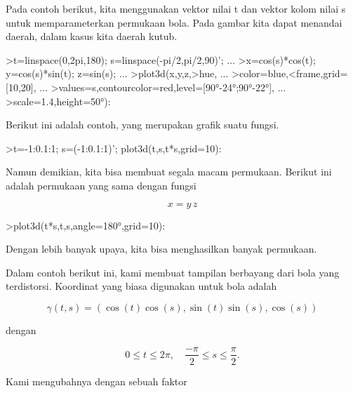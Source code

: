 \documentclass[a4paper,10pt]{article}
\begin{document}
\begin{eulernotebook}
\begin{eulercomment}
\begin{eulercomment}
\begin{eulercomment}
\begin{eulercomment}
\begin{eulercomment}
\begin{eulercomment}
\begin{eulercomment}
\begin{eulercomment}
\begin{eulercomment}
\begin{eulercomment}
\begin{eulercomment}
Pada contoh berikut, kita menggunakan vektor nilai t dan vektor kolom
nilai s untuk memparameterkan permukaan bola. Pada gambar kita dapat
menandai daerah, dalam kasus kita daerah kutub.
\end{eulercomment}
\begin{eulerprompt}
>t=linspace(0,2pi,180); s=linspace(-pi/2,pi/2,90)'; ...
>x=cos(s)*cos(t); y=cos(s)*sin(t); z=sin(s); ...
>plot3d(x,y,z,>hue, ...
>color=blue,<frame,grid=[10,20], ...
>values=s,contourcolor=red,level=[90°-24°;90°-22°], ...
>scale=1.4,height=50°):
\end{eulerprompt}
\begin{eulercomment}
Berikut ini adalah contoh, yang merupakan grafik suatu fungsi.
\end{eulercomment}
\begin{eulerprompt}
>t=-1:0.1:1; s=(-1:0.1:1)'; plot3d(t,s,t*s,grid=10):
\end{eulerprompt}
\begin{eulercomment}
Namun demikian, kita bisa membuat segala macam permukaan. Berikut ini
adalah permukaan yang sama dengan fungsi

\end{eulercomment}
\begin{eulerformula}
\[
x = y \, z
\]
\end{eulerformula}
\begin{eulerprompt}
>plot3d(t*s,t,s,angle=180°,grid=10):
\end{eulerprompt}
\begin{eulercomment}
Dengan lebih banyak upaya, kita bisa menghasilkan banyak permukaan.

Dalam contoh berikut ini, kami membuat tampilan berbayang dari bola
yang terdistorsi. Koordinat yang biasa digunakan untuk bola adalah

\end{eulercomment}
\begin{eulerformula}
\[
\gamma(t,s) = (\cos(t)\cos(s),\sin(t)\sin(s),\cos(s))
\]
\end{eulerformula}
\begin{eulercomment}
dengan

\end{eulercomment}
\begin{eulerformula}
\[
0 \le t \le 2\pi, \quad \frac{-\pi}{2} \le s \le \frac{\pi}{2}.
\]
\end{eulerformula}
\begin{eulercomment}
Kami mengubahnya dengan sebuah faktor


\end{eulercomment}
\end{eulercomment}
\end{eulercomment}
\end{eulercomment}
\end{eulercomment}
\end{eulercomment}
\end{eulercomment}
\end{eulercomment}
\end{eulercomment}
\end{eulercomment}
\end{eulercomment}
\end{eulernotebook}
\end{document}
